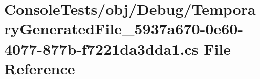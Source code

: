 \hypertarget{_console_tests_2obj_2_debug_2_temporary_generated_file__5937a670-0e60-4077-877b-f7221da3dda1_8cs}{}\section{Console\+Tests/obj/\+Debug/\+Temporary\+Generated\+File\+\_\+5937a670-\/0e60-\/4077-\/877b-\/f7221da3dda1.cs File Reference}
\label{_console_tests_2obj_2_debug_2_temporary_generated_file__5937a670-0e60-4077-877b-f7221da3dda1_8cs}
